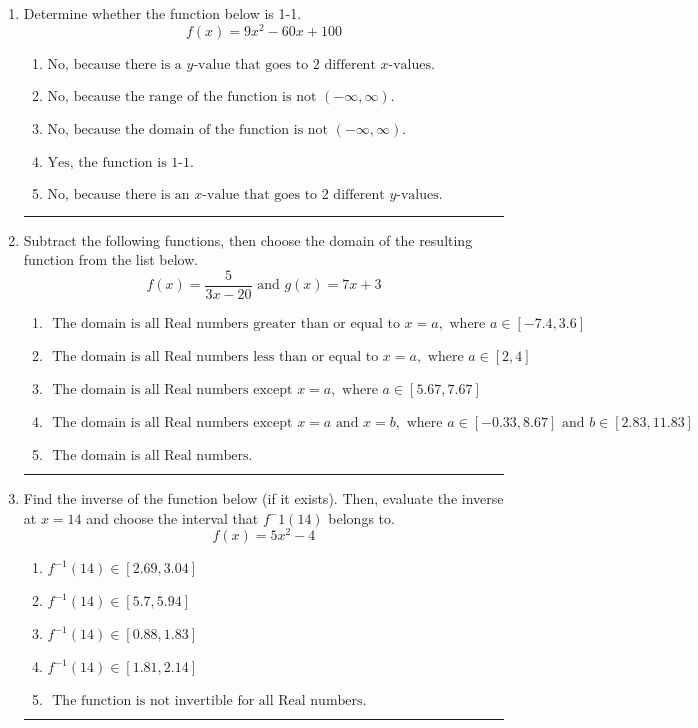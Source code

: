 \documentclass[14pt]{extbook}
\newcommand{\litem}[1]{\item#1\hspace*{-1cm}\rule{\textwidth}{0.4pt}}
\begin{document}
\begin{enumerate}
{\begin{enumerate}[label=\Alph*.]
\end{enumerate} }
\litem{
Determine whether the function below is 1-1.\[ f(x) = 9 x^2 - 60 x + 100 \]\begin{enumerate}[label=\Alph*.]
\item \( \text{No, because there is a $y$-value that goes to 2 different $x$-values.} \)
\item \( \text{No, because the range of the function is not $(-\infty, \infty)$.} \)
\item \( \text{No, because the domain of the function is not $(-\infty, \infty)$.} \)
\item \( \text{Yes, the function is 1-1.} \)
\item \( \text{No, because there is an $x$-value that goes to 2 different $y$-values.} \)

\end{enumerate} }
\litem{
Subtract the following functions, then choose the domain of the resulting function from the list below.\[ f(x) = \frac{5}{3x-20} \text{ and } g(x) = 7x + 3 \]\begin{enumerate}[label=\Alph*.]
\item \( \text{ The domain is all Real numbers greater than or equal to } x = a, \text{ where } a \in [-7.4, 3.6] \)
\item \( \text{ The domain is all Real numbers less than or equal to } x = a, \text{ where } a \in [2, 4] \)
\item \( \text{ The domain is all Real numbers except } x = a, \text{ where } a \in [5.67, 7.67] \)
\item \( \text{ The domain is all Real numbers except } x = a \text{ and } x = b, \text{ where } a \in [-0.33, 8.67] \text{ and } b \in [2.83, 11.83] \)
\item \( \text{ The domain is all Real numbers. } \)

\end{enumerate} }
\litem{
Find the inverse of the function below (if it exists). Then, evaluate the inverse at $x = 14$ and choose the interval that $f^-1(14)$ belongs to.\[ f(x) = 5 x^2 - 4 \]\begin{enumerate}[label=\Alph*.]
\item \( f^{-1}(14) \in [2.69, 3.04] \)
\item \( f^{-1}(14) \in [5.7, 5.94] \)
\item \( f^{-1}(14) \in [0.88, 1.83] \)
\item \( f^{-1}(14) \in [1.81, 2.14] \)
\item \( \text{ The function is not invertible for all Real numbers. } \)

\end{enumerate} }
\end{enumerate}
\end{document}
